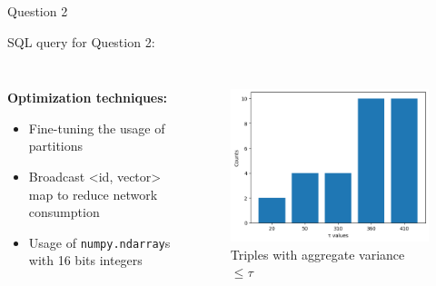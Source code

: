 \begin{block}{Question 2}
    
SQL query for Question 2:
\begin{center}
    \inputminted[]{sql}{../assets/code/q2.sql}
\end{center}
    
\begin{columns}
    \begin{column}{.45\linewidth}
        \textbf{Optimization techniques:}
        \begin{itemize}
            \item Fine-tuning the usage of partitions
            \item Broadcast <id, vector> map to reduce network consumption
            \item Usage of \texttt{numpy.ndarray}s with 16 bits integers
        \end{itemize}
    \end{column}
    \begin{column}{.45\linewidth}
        \begin{figure}[H]
            \centering
            \includegraphics[width=.85\linewidth]{../assets/images/q2_results.png}
            \caption{Triples with aggregate variance $ \le \tau$}
            \label{fig:q2_results}
        \end{figure}
    \end{column}
\end{columns}

\begin{columns}
    \begin{column}{.45\linewidth}
        \begin{table}[H]
            \centering
            
        \end{table}
    \end{column}
    \begin{column}{.45\linewidth}
        \begin{table}[H]
            \centering
            
        \end{table}
    \end{column}
\end{columns}
    
\end{block}

  